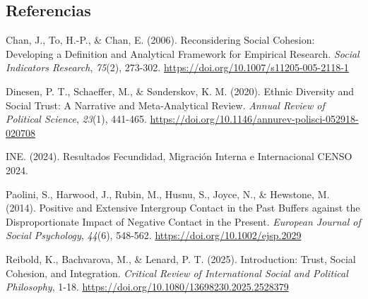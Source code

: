 \documentclass[
  spanish,
  letterpaper,
  DIV=11,
  numbers=noendperiod,
  oneside]{scrartcl}
\newlength{\cslhangindent}
\newenvironment{CSLReferences}[2] %
 {\begin{list}{}{%
  \setlength{\itemindent}{0pt}
  \setlength{\leftmargin}{0pt}
  \setlength{\parsep}{0pt}
  \ifodd #1
   \setlength{\leftmargin}{\cslhangindent}
   \setlength{\itemindent}{-1\cslhangindent}
  \fi
  \setlength{\itemsep}{#2\baselineskip}}}
 {\end{list}}
\begin{document}
\subsection{Referencias}\label{referencias}

\label{refs}
\begin{CSLReferences}{1}{0}
Chan, J., To, H.-P., \& Chan, E. (2006). Reconsidering {Social
Cohesion}: {Developing} a {Definition} and {Analytical Framework} for
{Empirical Research}. \emph{Social Indicators Research}, \emph{75}(2),
273-302. \url{https://doi.org/10.1007/s11205-005-2118-1}

Dinesen, P. T., Schaeffer, M., \& Sønderskov, K. M. (2020). Ethnic
{Diversity} and {Social Trust}: {A Narrative} and {Meta-Analytical
Review}. \emph{Annual Review of Political Science}, \emph{23}(1),
441-465. \url{https://doi.org/10.1146/annurev-polisci-052918-020708}

INE. (2024). Resultados {Fecundidad}, Migraci{ó}n Interna e
Internacional {CENSO} 2024.

Paolini, S., Harwood, J., Rubin, M., Husnu, S., Joyce, N., \& Hewstone,
M. (2014). Positive and Extensive Intergroup Contact in the Past Buffers
against the Disproportionate Impact of Negative Contact in the Present.
\emph{European Journal of Social Psychology}, \emph{44}(6), 548-562.
\url{https://doi.org/10.1002/ejsp.2029}

Reibold, K., Bachvarova, M., \& Lenard, P. T. (2025). Introduction:
Trust, Social Cohesion, and Integration. \emph{Critical Review of
International Social and Political Philosophy}, 1-18.
\url{https://doi.org/10.1080/13698230.2025.2528379}

\end{CSLReferences}
\end{document}
